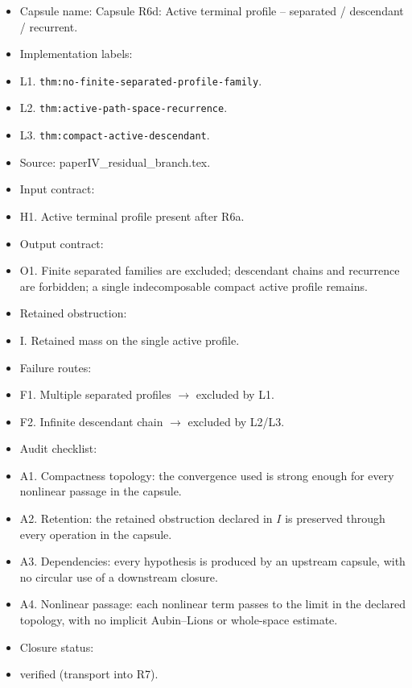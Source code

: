 \documentclass[11pt]{amsart}
\begin{document}
\begin{itemize}
  \item Capsule name: Capsule R6d: Active terminal profile -- separated / descendant / recurrent.
  \item Implementation labels:
  \item L1. \texttt{thm:no-finite-separated-profile-family}.
  \item L2. \texttt{thm:active-path-space-recurrence}.
  \item L3. \texttt{thm:compact-active-descendant}.
  \item Source: paperIV\_residual\_branch.tex.
  \item Input contract:
  \item H1. Active terminal profile present after R6a.
  \item Output contract:
  \item O1. Finite separated families are excluded; descendant chains and recurrence are forbidden; a single indecomposable compact active profile remains.
  \item Retained obstruction:
  \item I. Retained mass on the single active profile.
  \item Failure routes:
  \item F1. Multiple separated profiles $\to$ excluded by L1.
  \item F2. Infinite descendant chain $\to$ excluded by L2/L3.
  \item Audit checklist:
  \item A1. Compactness topology: the convergence used is strong enough for every nonlinear passage in the capsule.
  \item A2. Retention: the retained obstruction declared in $I$ is preserved through every operation in the capsule.
  \item A3. Dependencies: every hypothesis is produced by an upstream capsule, with no circular use of a downstream closure.
  \item A4. Nonlinear passage: each nonlinear term passes to the limit in the declared topology, with no implicit Aubin--Lions or whole-space estimate.
  \item Closure status:
  \item verified (transport into R7).
\end{itemize}
\end{document}
